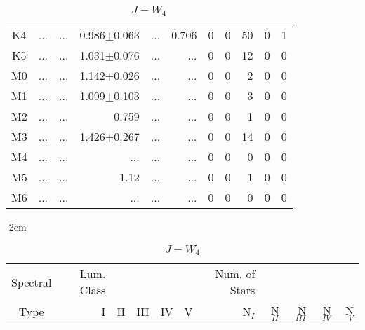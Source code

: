 \begin{table}[t]
\begin{table}[t]
\begin{center}
\begin{tabular}{c|rrrrr|rrrrr}
    K4	&	 ...	&	 ...	&	0.986$\pm$0.063	&	 ...	&	0.706	&	0	&	0	&	50	&	0	&	1	\\
    K5	&	 ...	&	 ...	&	1.031$\pm$0.076	&	 ...	&	 ...	&	0	&	0	&	12	&	0	&	0	\\
    M0	&	 ...	&	 ...	&	1.142$\pm$0.026	&	 ...	&	 ...	&	0	&	0	&	2	&	0	&	0	\\
    M1	&	 ...	&	 ...	&	1.099$\pm$0.103	&	 ...	&	 ...	&	0	&	0	&	3	&	0	&	0	\\
    M2	&	 ...	&	 ...	&	0.759	&	 ...	&	 ...	&	0	&	0	&	1	&	0	&	0	\\
    M3	&	 ...	&	 ...	&	1.426$\pm$0.267	&	 ...	&	 ...	&	0	&	0	&	14	&	0	&	0	\\
    M4	&	 ...	&	 ...	&	 ...	&	 ...	&	 ...	&	0	&	0	&	0	&	0	&	0	\\
    M5	&	 ...	&	 ...	&	1.12	&	 ...	&	 ...	&	0	&	0	&	1	&	0	&	0	\\
    M6	&	 ...	&	 ...	&	 ...	&	 ...	&	 ...	&	0	&	0	&	0	&	0	&	0	\\
        \bottomrule
        \end{tabular}
    \end{center}
    \end{table}
    
    
    \begin{table}[t]
    \tiny
    \centering
    \caption{$J-W_{4}$}
    \begin{center}
        \addtolength{\leftskip} {-2cm}
        \addtolength{\rightskip}{-2cm}
        \begin{tabular}{c|rrrrr|rrrrr}
        \toprule
        Spectral & Lum. Class & & & & & Num. of Stars & & & &  \\
        Type & I & II & III &  IV & V & N$_{I}$ & N$_{II}$ & N$_{III}$ & N$_{IV}$ & N$_{V}$ \\ \midrule
    

\end{tabular}
\end{center}
\end{table}
\end{table}
